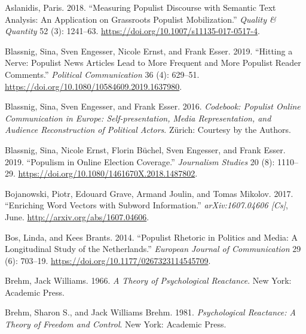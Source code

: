 \documentclass[
]{ccr}
\newlength{\cslhangindent}
\newlength{\cslentryspacingunit} %
\newenvironment{CSLReferences}[2] %
 {%
  \setlength{\parindent}{0pt}
  \ifodd #1
  \let\oldpar\par
  \def\par{\hangindent=\cslhangindent\oldpar}
  \fi
  \setlength{\parskip}{#2\cslentryspacingunit}
 }%
 {}
\begin{document}
\hypertarget{refs}{}
\begin{CSLReferences}{1}{0}
\leavevmode{}%
Aslanidis, Paris. 2018. {``Measuring Populist Discourse with Semantic
Text Analysis: An Application on Grassroots Populist Mobilization.''}
\emph{Quality \& Quantity} 52 (3): 1241--63.
\url{https://doi.org/10.1007/s11135-017-0517-4}.

\leavevmode{}%
Blassnig, Sina, Sven Engesser, Nicole Ernst, and Frank Esser. 2019.
{``Hitting a Nerve: {Populist} News Articles Lead to More Frequent and
More Populist Reader Comments.''} \emph{Political Communication} 36 (4):
629--51. \url{https://doi.org/10.1080/10584609.2019.1637980}.

\leavevmode{}%
Blassnig, Sina, Sven Engesser, and Frank Esser. 2016. \emph{Codebook:
{Populist} Online Communication in {Europe}: {Self-presentation}, Media
Representation, and Audience Reconstruction of Political Actors}.
{Z{ü}rich}: {Courtesy by the Authors}.

\leavevmode{}%
Blassnig, Sina, Nicole Ernst, Florin Büchel, Sven Engesser, and Frank
Esser. 2019. {``Populism in {Online Election Coverage}.''}
\emph{Journalism Studies} 20 (8): 1110--29.
\url{https://doi.org/10.1080/1461670X.2018.1487802}.

\leavevmode{}%
Bojanowski, Piotr, Edouard Grave, Armand Joulin, and Tomas Mikolov.
2017. {``Enriching Word Vectors with Subword Information.''}
\emph{arXiv:1607.04606 {[}Cs{]}}, June.
\url{http://arxiv.org/abs/1607.04606}.

\leavevmode{}%
Bos, Linda, and Kees Brants. 2014. {``Populist Rhetoric in Politics and
Media: {A} Longitudinal Study of the {Netherlands}.''} \emph{European
Journal of Communication} 29 (6): 703--19.
\url{https://doi.org/10.1177/0267323114545709}.

\leavevmode{}%
Brehm, Jack Williams. 1966. \emph{A Theory of Psychological Reactance}.
{New York}: {Academic Press}.

\leavevmode{}%
Brehm, Sharon S., and Jack Williams Brehm. 1981. \emph{Psychological
Reactance: A Theory of Freedom and Control}. {New York}: {Academic
Press}.


\end{CSLReferences}
\end{document}
